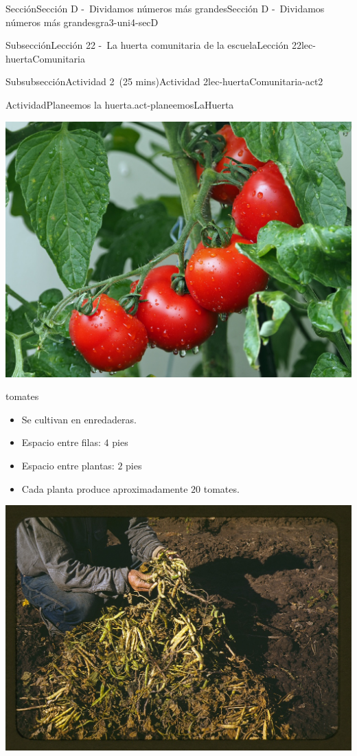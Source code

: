 \documentclass[oneside,10pt,]{article}
\begin{document}
\begin{sectionptx}{Sección}{Sección D -~Dividamos números más grandes}{}{Sección D -~Dividamos números más grandes}{}{}{gra3-uni4-secD}
\begin{subsectionptx}{Subsección}{Lección 22 -~La huerta comunitaria de la escuela}{}{Lección 22}{}{}{lec-huertaComunitaria}
\begin{subsubsectionptx}{Subsubsección}{Actividad 2~(25 mins)}{}{Actividad 2}{}{}{lec-huertaComunitaria-act2}
\begin{activity}{Actividad}{Planeemos la huerta.}{act-planeemosLaHuerta}
\begin{sidebyside}{2}{0.025}{0.025}{0.05}
\begin{sbspanel}{0.45}
\includegraphics[width=\linewidth]{external/jpg-source/3-4-D-22 Act2-tomate.jpg}
%
\par
tomates%
%
\begin{itemize}[label=\textbullet]
\item{}Se cultivan en enredaderas.%
\item{}Espacio entre filas: \(4\) pies%
\item{}Espacio entre plantas: \(2\) pies%
\item{}Cada planta produce aproximadamente \(20\) tomates.%
\end{itemize}
\end{sbspanel}%
\end{sidebyside}%
\begin{sidebyside}{2}{0.025}{0.025}{0.05}%
\begin{sbspanel}{0.45}%
\includegraphics[width=\linewidth]{external/jpg-source/3-4-D-22 Act2-frijoles-pintos.jpg}

\end{sbspanel}
\end{sidebyside}
\end{activity}
\end{subsubsectionptx}
\end{subsectionptx}
\end{sectionptx}
\end{document}
